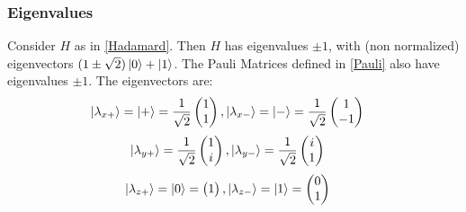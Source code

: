 \documentclass{beamer}
\begin{document}
\begin{frame}
    \frametitle{Eigenvalues}
    \begin{example}
        Consider $H$ as in \ref{Hadamard}. Then $H$ has eigenvalues $\pm 1$, with (non normalized) eigenvectors $(1 \pm \sqrt{2})\ket{0} + \ket{1}$.
        The Pauli Matrices defined in \ref{Pauli} also have eigenvalues $\pm 1$. The eigenvectors are:
        \begin{align}
            \label{decomposition}
            \ket{\lambda_{x+}} = \ket{+} & = \frac{1}{\sqrt{2}} \begin{pmatrix}
                1 \\
                1
            \end{pmatrix},
            \ket{\lambda_{x-}} = \ket{-} = \frac{1}{\sqrt{2}} \begin{pmatrix}
                1 \\
                -1
            \end{pmatrix}
        \end{align}
        \begin{align}
            \ket{\lambda_{y+}} & = \frac{1}{\sqrt{2}} \begin{pmatrix}
                1 \\
                i
            \end{pmatrix},
            \ket{\lambda_{y-}} = \frac{1}{\sqrt{2}} \begin{pmatrix}
                i \\
                1
            \end{pmatrix}
        \end{align}
        \begin{align}
            \ket{\lambda_{z+}} & = \ket{0} = \begin{pmatrix}
                1 \\
            \end{pmatrix},
            \ket{\lambda_{z-}} = \ket{1} = \begin{pmatrix}
                0 \\
                1
            \end{pmatrix}
        \end{align}
    \end{example}
\end{frame}
\end{document}
